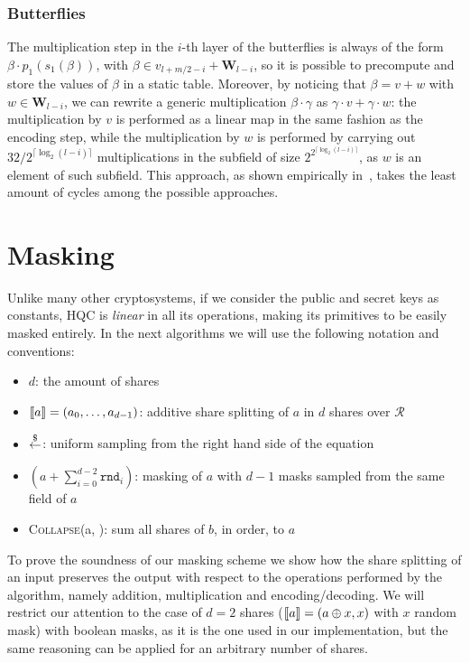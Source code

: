     \subsubsection{Butterflies}
        The multiplication step in the $i$-th layer of the butterflies is always of the form $\beta \cdot p_1(s_1(\beta))$, with
        $\beta \in v_{l+m/2-i}+\mathbf{W}_{l-i}$, so it is possible to precompute and store the values of $\beta$ in a static table.
        Moreover, by noticing that $\beta = v + w$ with $w \in \mathbf{W}_{l-i}$, we can rewrite a generic multiplication $\beta \cdot \gamma$ as
        $\gamma \cdot v + \gamma \cdot w$: the multiplication by $v$ is performed as a linear map in the same fashion as the encoding step,
        while the multiplication by $w$ is performed by carrying out $32/2^{\lceil \log_2(l-i)\rceil}$ multiplications in the subfield of
        size $2^{2^{\lceil \log_2 (l-i) \rceil}}$, as $w$ is an element of such subfield.
        This approach, as shown empirically in~\cite{DBLP:journals/tches/ChenCK21}, takes the least amount of cycles among the possible approaches.
        

\section{Masking}

    Unlike many other cryptosystems, if we consider the public and secret keys as constants, HQC is \textit{linear} in all its operations, 
    making its primitives to be easily masked entirely.
    In the next algorithms we will use the following notation and conventions:
    \begin{itemize}
        \item $d$: the amount of shares
        \item $ \llbracket a \rrbracket  = (a_0,\ldots,a_{d-1})$: additive share splitting of $a$ in $d$ shares over $\mathcal{R}$
        \item $ \stackrel{\$}{\gets} $: uniform sampling from the right hand side of the equation
        \item $(a+\sum_{i=0}^{d-2} \mathtt{rnd}_i)$: masking of $a$ with $d-1$ masks sampled from the same field of $a$
        \item \textsc{Collapse}(a, ): sum all shares of $b$, in order, to $a$
    \end{itemize}
    To prove the soundness of our masking scheme we show how the share splitting of an input preserves the output
    with respect to the operations performed by the algorithm, namely addition, multiplication and encoding/decoding.
    We will restrict our attention to the case of $d=2$ shares ($ \llbracket a \rrbracket  = (a\oplus x, x)$ with $x$ random mask) with boolean masks,
    as it is the one used in our implementation, but the same reasoning can be applied for an arbitrary number of shares.


